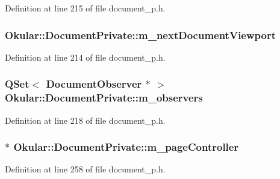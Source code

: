Definition at line 215 of file document\+\_\+p.\+h.

\hypertarget{classOkular_1_1DocumentPrivate_af6aae2128fb788ae1693699506a86c0d}{
\subsubsection[{m\+\_\+next\+Document\+Viewport}]{ Okular\+::\+Document\+Private\+::m\+\_\+next\+Document\+Viewport}}\label{classOkular_1_1DocumentPrivate_af6aae2128fb788ae1693699506a86c0d}


Definition at line 214 of file document\+\_\+p.\+h.

\hypertarget{classOkular_1_1DocumentPrivate_a604d83cdce56b4cab8d2bcccfc01fbfa}{
\subsubsection[{m\+\_\+observers}]{\setlength{\rightskip}{0pt plus 5cm}Q\+Set$<$ {\bf Document\+Observer} $\ast$ $>$ Okular\+::\+Document\+Private\+::m\+\_\+observers}}\label{classOkular_1_1DocumentPrivate_a604d83cdce56b4cab8d2bcccfc01fbfa}


Definition at line 218 of file document\+\_\+p.\+h.

\hypertarget{classOkular_1_1DocumentPrivate_a0764e01a78ed52ece9229f50300522f1}{
\subsubsection[{m\+\_\+page\+Controller}]{$\ast$ Okular\+::\+Document\+Private\+::m\+\_\+page\+Controller}}\label{classOkular_1_1DocumentPrivate_a0764e01a78ed52ece9229f50300522f1}


Definition at line 258 of file document\+\_\+p.\+h.

